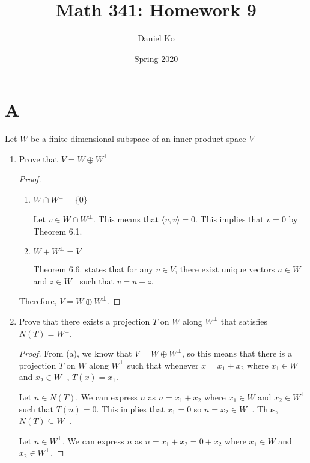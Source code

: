 \documentclass[11pt]{scrartcl}
\title{Math 341: Homework 9}
\author{Daniel Ko}
\date{Spring 2020}
\begin{document}
\maketitle

\section{A}
Let $W$ be a finite-dimensional subspace of an inner product space $V$

\begin{enumerate}[label=\alph*.]
	\item{
	      Prove that $V = W \oplus W^{\bot}$
	      \begin{proof}\
		      \begin{enumerate}[label=\roman*.]
			      \item{
			            $W \cap W^{\bot} = \{0\}$\par
			            Let $v \in W \cap W^{\bot}$. This means that $\langle v,v \rangle = 0$.
			            This implies that $v = 0$ by Theorem 6.1.
			            }
			      \item{
			            $W + W^{\bot} = V$\par
			            Theorem 6.6. states that for any $v \in V$, there exist unique vectors $u \in W$ and $z \in W^{\bot}$
			            such that $v = u + z$.
			            }
		      \end{enumerate}
		      Therefore, $V = W \oplus W^{\bot}$.
	      \end{proof}
	      }
	\item{
	      Prove that there exists a projection $T$ on $W$ along $W^{\bot}$ that satisfies $N(T) = W^{\bot}$.
	      \begin{proof}
		      From (a), we know that $V = W \oplus W^{\bot}$, so this means that there is a
		      projection $T$ on $W$ along $W^{\bot}$ such that
		      whenever $x = x_1 + x_2$ where $x_1 \in W$ and $x_2 \in W^{\bot}$, $T(x) = x_1$.  \par
		      Let $n \in N(T)$. We can express $n$ as $n = x_1 + x_2$ where $x_1 \in W$ and $x_2 \in W^{\bot}$ such that $T(n) = 0$.
		      This implies that $x_1 = 0$ so $n = x_2 \in W^{\bot}$. Thus, $N(T) \subseteq W^{\bot}$.\par
		      Let $n \in W^{\bot}$. We can express $n$ as $n = x_1 + x_2 = 0 + x_2$ where $x_1 \in W$ and $x_2 \in W^{\bot}$.

\end{proof}}
\end{enumerate}
\end{document}
